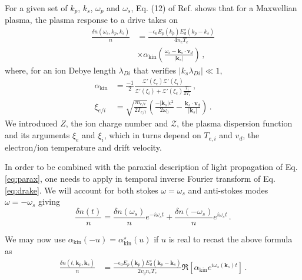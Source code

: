 \documentclass[
 reprint,
 amsmath,amssymb,
 aps,
]{revtex4-1}
\begin{document}
For a given set of $k_p$, $k_s$, $\omega_p$ and $\omega_s$, Eq. (12) of  Ref. \cite[]{POF_Drake_1973} shows that  for  a Maxwellian plasma, the plasma response to a drive  takes on 
\begin{align}
 \frac{ \delta n (\omega_s, k_p,k_s) }{n}  &=   \frac{ -\epsilon_0 E_p(k_p) E_d^\star(k_p-k_s) }{ 4 n_c T_e } \nonumber \\  &\times \alpha_\mathrm{kin}\left(\frac{\omega_s- \mathbf{k}_s\cdot \mathbf{v}_d}{\vert \mathbf{k}_s \vert }\right)   \, ,\label{eq:drake}
 \end{align}
 where, for an ion Debye length $\lambda_{Di}$ that verifies $\vert k_s \lambda_{Di} \vert \ll 1$, %
 \begin{align}
\alpha_\mathrm{kin} &=  \frac{-1}{2}\frac{ \mathcal{Z}'( \xi_e)\mathcal{Z}'( \xi_i)    }{   \mathcal{Z}'( \xi_i) + \mathcal{Z}'( \xi_e)\frac{  T_i }{ ZT_e } }    \, , \label{eq:drakea}\\
\xi_{e/i } &=  \sqrt{ \frac{ m_{e/i } }{ 2T_{e/i }}  } \left( \frac{ -\vert \mathbf{k}_s\vert c^2  }{  2\omega_0 }  - \frac{    \mathbf{k}_s \cdot \mathbf{v}_d }{  \vert \mathbf{k}_s\vert }\right)  \label{eq:xiie}   \,  .
\end{align}
We introduced $Z$, the ion charge number and  $ \mathcal{Z}$, the plasma dispersion function \cite{Fried_Gell-Mann_1960} and its arguments $\xi_{e } $ and $\xi_{i }$, which in turns depend on $T_{e,i}$ and $v_d$, the electron/ion temperature and  drift velocity.

In order to be combined with the paraxial description of light propagation of Eq. \eqref{eq:parax}, one needs to apply in temporal inverse Fourier transform of Eq. \eqref{eq:drake}. We will account for both stokes $\omega=\omega_s$ and anti-stokes modes $\omega=-\omega_s$ giving 
\begin{equation}\label{eq:sa}
     \frac{ \delta n (t) }{n}= \frac{ \delta n (\omega_s) }{n}e^{-i\omega_st} + \frac{ \delta n (-\omega_s) }{n}e^{i\omega_st}\, .
\end{equation}

We may now use $\alpha_\mathrm{kin}(-u) = \alpha^\star_\mathrm{kin}(u) $ if $u$ is real to recast the above formula as 
\begin{align}
\frac{ \delta n (t,\mathbf{k}_p,\mathbf{k}_s ) }{n}  &=   \frac{ -\epsilon_0 E_p(\mathbf{k}_p) E_d^\star(\mathbf{k}_p-\mathbf{k}_s)  }{ 2 v_g n_c T_e } 
 \Re \left[ \alpha_\mathrm{kin}  e^{ i\omega_s(\mathbf{k}_s) t} \right]  \, .\label{eq:drakef}
\end{align}
\end{document}
